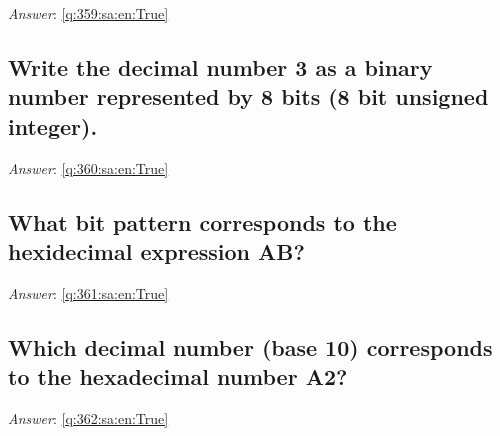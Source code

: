 \documentclass[a4paper,11pt,oneside]{article}
\begin{document}
\begin{sloppypar}
\vspace{2cm}

\noindent\makebox[\textwidth]{\hrulefill}

\vspace{1cm}

\textit{Answer}: \autoref{q:359:sa:en:True}



\subsection{Write the decimal number 3 as a binary number represented by 8 bits (8 bit unsigned integer).}

\label{q:360:sa:en:False}

\vspace{2cm}

\noindent\makebox[\textwidth]{\hrulefill}

\vspace{1cm}

\textit{Answer}: \autoref{q:360:sa:en:True}



\subsection{What bit pattern corresponds to the hexidecimal expression AB?}

\label{q:361:sa:en:False}

\vspace{2cm}

\noindent\makebox[\textwidth]{\hrulefill}

\vspace{1cm}

\textit{Answer}: \autoref{q:361:sa:en:True}



\subsection{Which decimal number (base 10) corresponds to the hexadecimal number  A2?}

\label{q:362:sa:en:False}

\vspace{2cm}

\noindent\makebox[\textwidth]{\hrulefill}

\vspace{1cm}

\textit{Answer}: \autoref{q:362:sa:en:True}




\end{sloppypar}
\end{document}
